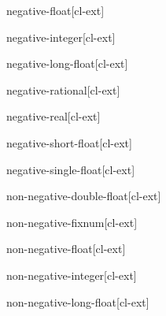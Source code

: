 \documentclass[10pt,english]{book}
\begin{document}
\begin{type}{negative-float}{}[cl-ext]
  
\end{type}

\begin{type}{negative-integer}{}[cl-ext]
  
\end{type}

\begin{type}{negative-long-float}{}[cl-ext]
  
\end{type}

\begin{type}{negative-rational}{}[cl-ext]
  
\end{type}

\begin{type}{negative-real}{}[cl-ext]
  
\end{type}

\begin{type}{negative-short-float}{}[cl-ext]
  
\end{type}

\begin{type}{negative-single-float}{}[cl-ext]
  
\end{type}

\begin{type}{non-negative-double-float}{}[cl-ext]
  
\end{type}

\begin{type}{non-negative-fixnum}{}[cl-ext]
  
\end{type}

\begin{type}{non-negative-float}{}[cl-ext]
  
\end{type}

\begin{type}{non-negative-integer}{}[cl-ext]
  
\end{type}

\begin{type}{non-negative-long-float}{}[cl-ext]
  
\end{type}
\end{document}
